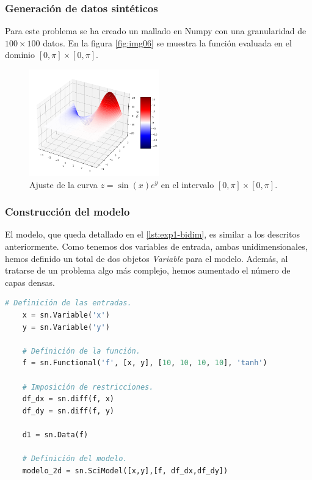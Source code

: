 \subsubsection{Generación de datos sintéticos}
Para este problema se ha creado un mallado en Numpy con una granularidad de $100\times 100$ datos. En la figura \autoref{fig:img06} se muestra la función evaluada en el dominio $[0,\pi]\times [0,\pi]$.
 \begin{figure}[htbp]
    \centering
    \includegraphics[width=0.5\textwidth]{img/img06.png}
    \caption{Ajuste de la curva $z=\sin(x)e^{y}$ en el intervalo $[0,\pi]\times [0,\pi]$.}
    \label{fig:img06}
\end{figure}

\subsubsection{Construcción del modelo}

El modelo, que queda detallado en el \autoref{lst:exp1-bidim}, es similar a los descritos anteriormente. Como tenemos dos variables de entrada, ambas unidimensionales, hemos definido un total de dos objetos \textit{Variable} para el modelo. Además, al tratarse de un problema algo más complejo, hemos aumentado el número de capas densas. 

\begin{lstlisting}[language=Python,caption={Modelo en \textit{SciANN} para ajuste bidimensional.},label={lst:exp1-bidim}]
    # Definición de las entradas.
    x = sn.Variable('x')
    y = sn.Variable('y')
    
    # Definición de la función.
    f = sn.Functional('f', [x, y], [10, 10, 10, 10], 'tanh')
    
    # Imposición de restricciones.
    df_dx = sn.diff(f, x)
    df_dy = sn.diff(f, y)
    
    d1 = sn.Data(f)

    # Definición del modelo.
    modelo_2d = sn.SciModel([x,y],[f, df_dx,df_dy])
\end{lstlisting}

